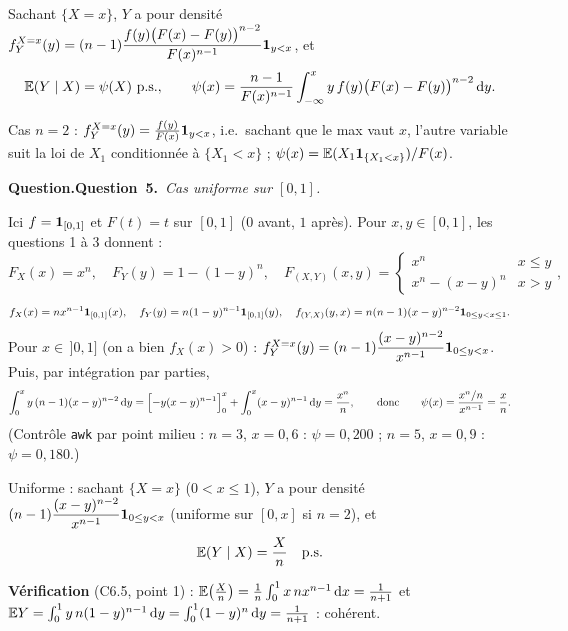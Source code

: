\documentclass[11pt,a4paper]{article}
\newcommand{\question}[2]{\par\medskip\noindent\textbf{\ifx\relax#1\relax Question.\else Question~#1.\fi}~\textit{#2}\par\smallskip}
\begin{document}
\begin{exo}
\begin{resultat}
Sachant $\{X=x\}$, $Y$ a pour densité $\displaystyle f_Y^{X=x}(y)=(n-1)\frac{f(y)\bigl(F(x)-F(y)\bigr)^{n-2}}{F(x)^{n-1}}\mathbf{1}_{y<x}$, et
\[\mathbb{E}(Y\mid X)=\psi(X)\ \text{p.s.},\qquad \psi(x)=\frac{n-1}{F(x)^{n-1}}\int_{-\infty}^{x}y\,f(y)\bigl(F(x)-F(y)\bigr)^{n-2}\,\mathrm{d} y .\]
\end{resultat}
Cas $n=2$ : $f_Y^{X=x}(y)=\frac{f(y)}{F(x)}\mathbf{1}_{y<x}$, i.e.\ sachant que le max vaut $x$, l'autre variable suit la loi de $X_1$ conditionnée à
$\{X_1<x\}$ ; $\psi(x)=\mathbb{E}(X_1\mathbf{1}_{\{X_1<x\}})/F(x)$.

\question{5}{Cas uniforme sur $[0,1]$.}

Ici $f=\mathbf{1}_{[0,1]}$ et $F(t)=t$ sur $[0,1]$ ($0$ avant, $1$ après). Pour $x,y\in[0,1]$, les questions 1 à 3 donnent :
\[F_X(x)=x^n,\quad F_Y(y)=1-(1-y)^n,\quad F_{(X,Y)}(x,y)=\begin{cases}x^n&x\le y\\x^n-(x-y)^n&x>y\end{cases},\]
\[f_X(x)=nx^{n-1}\mathbf{1}_{[0,1]}(x),\quad f_Y(y)=n(1-y)^{n-1}\mathbf{1}_{[0,1]}(y),\quad f_{(Y,X)}(y,x)=n(n-1)(x-y)^{n-2}\mathbf{1}_{0\le y<x\le1}.\]
Pour $x\in\,]0,1]$ (on a bien $f_X(x)>0$) : $f_Y^{X=x}(y)=(n-1)\dfrac{(x-y)^{n-2}}{x^{n-1}}\mathbf{1}_{0\le y<x}$. Puis, par intégration par parties,
\[\int_0^xy\,(n-1)(x-y)^{n-2}\,\mathrm{d} y=\Bigl[-y(x-y)^{n-1}\Bigr]_0^x+\int_0^x(x-y)^{n-1}\,\mathrm{d} y=\frac{x^n}n,
\qquad\text{donc}\qquad\psi(x)=\frac{x^n/n}{x^{n-1}}=\frac xn .\]
(Contrôle \texttt{awk} par point milieu : $n=3$, $x=0{,}6$ : $\psi=0{,}200$ ; $n=5$, $x=0{,}9$ : $\psi=0{,}180$.)

\begin{resultat}
Uniforme : sachant $\{X=x\}$ ($0<x\le1$), $Y$ a pour densité $(n-1)\dfrac{(x-y)^{n-2}}{x^{n-1}}\mathbf{1}_{0\le y<x}$ (uniforme sur $[0,x]$ si $n=2$), et
\[\mathbb{E}(Y\mid X)=\frac Xn\quad\text{p.s.}\]
\end{resultat}
\textbf{Vérification} (C6.5, point 1) : $\mathbb{E}\bigl(\frac Xn\bigr)=\frac1n\int_0^1x\,nx^{n-1}\,\mathrm{d} x=\frac1{n+1}$ et
$\mathbb{E} Y=\int_0^1y\,n(1-y)^{n-1}\,\mathrm{d} y=\int_0^1(1-y)^n\,\mathrm{d} y=\frac1{n+1}$ : cohérent.
\end{exo}
\end{document}
